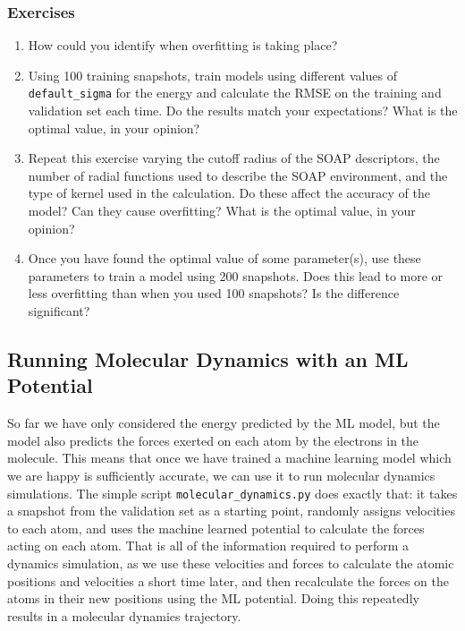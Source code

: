 \documentclass{article}
\begin{document}
\subsubsection*{Exercises}

\begin{enumerate}
\item How could you identify when overfitting is taking place?
\item Using 100 training snapshots, train models using different values of \verb|default_sigma| for the energy and calculate the RMSE on the training and validation set each time. Do the results match your expectations? What is the optimal value, in your opinion?
\item Repeat this exercise varying the cutoff radius of the SOAP descriptors, the number of radial functions used to describe the SOAP environment, and the type of kernel used in the calculation. Do these affect the accuracy of the model? Can they cause overfitting? What is the optimal value, in your opinion?
\item Once you have found the optimal value of some parameter(s), use these parameters to train a model using 200 snapshots. Does this lead to more or less overfitting than when you used 100 snapshots? Is the difference significant?

\end{enumerate}

\subsection{Running Molecular Dynamics with an ML Potential}
\label{sec:md}

So far we have only considered the energy predicted by the ML model, but the model also predicts the forces exerted on each atom by the electrons in the molecule. This means that once we have trained a machine learning model which we are happy is sufficiently accurate, we can use it to run molecular dynamics simulations. The simple script \verb|molecular_dynamics.py| does exactly that: it takes a snapshot from the validation set as a starting point, randomly assigns velocities to each atom, and uses the machine learned potential to calculate the forces acting on each atom. That is all of the information required to perform a dynamics simulation, as we use these velocities and forces to calculate the atomic positions and velocities a short time later, and then recalculate the forces on the atoms in their new positions using the ML potential. Doing this repeatedly results in a molecular dynamics trajectory.
\end{document}
